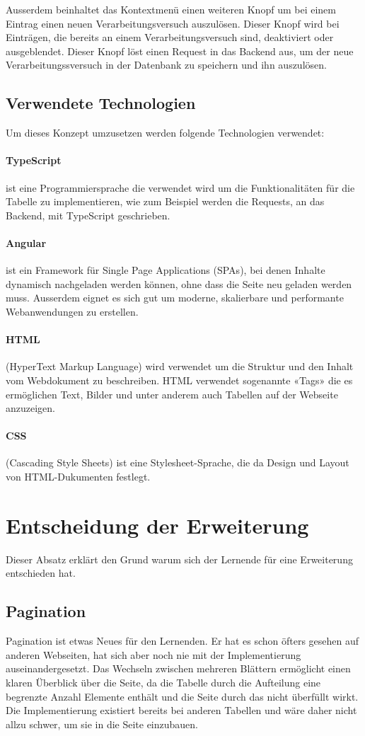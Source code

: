Ausserdem beinhaltet das Kontextmenü einen weiteren Knopf um bei einem Eintrag einen neuen Verarbeitungsversuch auszulösen. Dieser Knopf wird bei Einträgen, die bereits an einem Verarbeitungsversuch sind, deaktiviert oder ausgeblendet. Dieser Knopf löst einen Request in das Backend aus, um der neue Verarbeitungssversuch in der Datenbank zu speichern und ihn auszulösen.

\subsection{Verwendete Technologien}
Um dieses Konzept umzusetzen werden folgende Technologien verwendet:

\paragraph{TypeScript} ist eine Programmiersprache die verwendet wird um die Funktionalitäten für die Tabelle zu implementieren, wie zum Beispiel werden die Requests, an das Backend, mit TypeScript geschrieben.
\paragraph{Angular} ist ein Framework für Single Page Applications (SPAs), bei denen Inhalte dynamisch nachgeladen werden können, ohne dass die Seite neu geladen werden muss. Ausserdem eignet es sich gut um moderne, skalierbare und performante Webanwendungen zu erstellen.
\paragraph{HTML} (HyperText Markup Language) wird verwendet um die Struktur und den Inhalt vom Webdokument zu beschreiben. HTML verwendet sogenannte «Tags» die es ermöglichen Text, Bilder und unter anderem auch Tabellen auf der Webseite anzuzeigen.
\paragraph{CSS} (Cascading Style Sheets) ist eine Stylesheet-Sprache, die da Design und Layout von HTML-Dukumenten festlegt.

\section{Entscheidung der Erweiterung}
Dieser Absatz erklärt den Grund warum sich der Lernende für eine Erweiterung entschieden hat.

\subsection{Pagination}
Pagination ist etwas Neues für den Lernenden. Er hat es schon öfters gesehen auf anderen Webseiten, hat sich aber noch nie mit der Implementierung auseinandergesetzt. Das Wechseln zwischen mehreren Blättern ermöglicht einen klaren Überblick über die Seite, da die Tabelle durch die Aufteilung eine begrenzte Anzahl Elemente enthält und die Seite durch das nicht überfüllt wirkt. Die Implementierung existiert bereits bei anderen Tabellen und wäre daher nicht allzu schwer, um sie in die Seite einzubauen.

